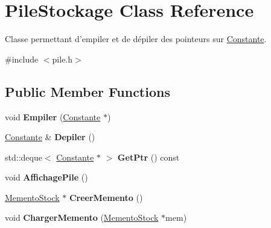\hypertarget{class_pile_stockage}{\section{Pile\-Stockage Class Reference}
\label{class_pile_stockage}
}


Classe permettant d'empiler et de dépiler des pointeurs sur \hyperlink{class_constante}{Constante}.  




{\ttfamily \#include $<$pile.\-h$>$}

\subsection*{Public Member Functions}
\begin{DoxyCompactItemize}
\item 
\hypertarget{class_pile_stockage_abab257876447da78f207a37157f6d3c8}{void {\bfseries Empiler} (\hyperlink{class_constante}{Constante} $\ast$)}\label{class_pile_stockage_abab257876447da78f207a37157f6d3c8}

\item 
\hypertarget{class_pile_stockage_a042c00dd20322ab9c88fcc403ee3af1f}{\hyperlink{class_constante}{Constante} \& {\bfseries Depiler} ()}\label{class_pile_stockage_a042c00dd20322ab9c88fcc403ee3af1f}

\item 
\hypertarget{class_pile_stockage_aa95f27fc7ae06630b58db52faf6316f8}{std\-::deque$<$ \hyperlink{class_constante}{Constante} $\ast$ $>$ {\bfseries Get\-Ptr} () const }\label{class_pile_stockage_aa95f27fc7ae06630b58db52faf6316f8}

\item 
\hypertarget{class_pile_stockage_a27319570899f25a4f0e1f7408ced9127}{void {\bfseries Affichage\-Pile} ()}\label{class_pile_stockage_a27319570899f25a4f0e1f7408ced9127}

\item 
\hypertarget{class_pile_stockage_af558173619e4a4859f740808616a741b}{\hyperlink{class_memento_stock}{Memento\-Stock} $\ast$ {\bfseries Creer\-Memento} ()}\label{class_pile_stockage_af558173619e4a4859f740808616a741b}

\item 
\hypertarget{class_pile_stockage_ab545906e2168095847357f3cbd6c9481}{void {\bfseries Charger\-Memento} (\hyperlink{class_memento_stock}{Memento\-Stock} $\ast$mem)}\label{class_pile_stockage_ab545906e2168095847357f3cbd6c9481}


\end{DoxyCompactItemize}
